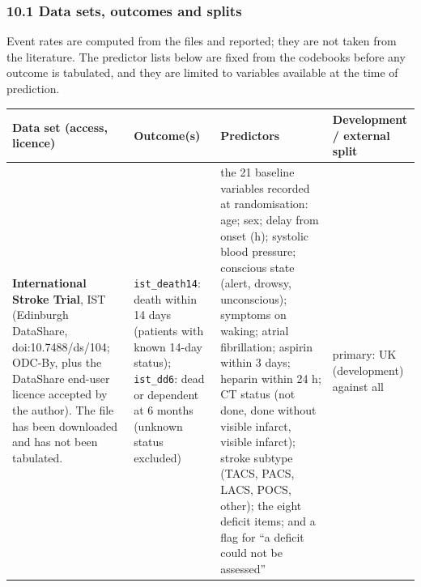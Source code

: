 \documentclass[
  10pt,
]{article}
\newcounter{none} %
\begin{document}
\subsubsection{10.1 Data sets, outcomes and
splits}\label{data-sets-outcomes-and-splits}

Event rates are computed from the files and reported; they
are not taken from the literature. The predictor lists below
are fixed from the codebooks before any outcome is
tabulated, and they are limited to variables available at
the time of prediction.

{\def\LTcaptype{none} %
\begin{longtable}[]{@{}
  >{\raggedright\arraybackslash}p{}
  >{\raggedright\arraybackslash}p{}
  >{\raggedright\arraybackslash}p{}
  >{\raggedright\arraybackslash}p{}@{}}
\toprule\noalign{}
\begin{minipage}[b]{\linewidth}\raggedright
Data set (access, licence)
\end{minipage} & \begin{minipage}[b]{\linewidth}\raggedright
Outcome(s)
\end{minipage} & \begin{minipage}[b]{\linewidth}\raggedright
Predictors
\end{minipage} & \begin{minipage}[b]{\linewidth}\raggedright
Development / external split
\end{minipage} \\
\midrule\noalign{}
\endhead
\bottomrule\noalign{}
\endlastfoot
\textbf{International Stroke Trial}, IST (Edinburgh
DataShare, doi:10.7488/ds/104; ODC-By, plus the DataShare
end-user licence accepted by the author). The file has been
downloaded and has not been tabulated. &
\texttt{ist\_death14}: death within 14 days (patients with
known 14-day status); \texttt{ist\_dd6}: dead or dependent
at 6 months (unknown status excluded) & the 21 baseline
variables recorded at randomisation: age; sex; delay from
onset (h); systolic blood pressure; conscious state (alert,
drowsy, unconscious); symptoms on waking; atrial
fibrillation; aspirin within 3 days; heparin within 24 h; CT
status (not done, done without visible infarct, visible
infarct); stroke subtype (TACS, PACS, LACS, POCS, other);
the eight deficit items; and a flag for ``a deficit could
not be assessed'' & primary: UK (development) against all

\end{longtable}}
\end{document}
